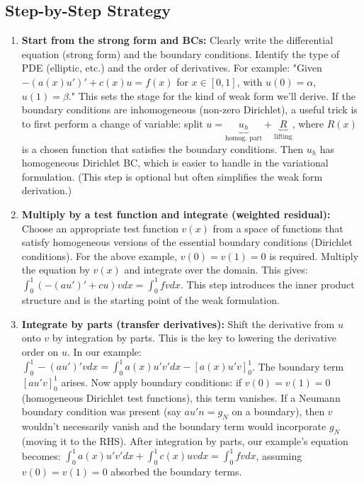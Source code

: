 \documentclass[a4paper,11pt]{report}
\begin{document}
\subsection{Step-by-Step Strategy}

\begin{enumerate}
    \item \textbf{Start from the strong form and BCs:} Clearly write the differential equation (strong form) and the boundary conditions. Identify the type of PDE (elliptic, etc.) and the order of derivatives. For example: "Given $- (a(x) u')' + c(x) u = f(x)$ for $x\in [0,1]$, with $u(0)=\alpha$, $u(1)=\beta$." This sets the stage for the kind of weak form we'll derive. If the boundary conditions are inhomogeneous (non-zero Dirichlet), a useful trick is to first perform a change of variable: split $u = \underbrace{u_h}_{\text{homog. part}} + \underbrace{R}_{\text{lifting}}$, where $R(x)$ is a chosen function that satisfies the boundary conditions. Then $u_h$ has homogeneous Dirichlet BC, which is easier to handle in the variational formulation. (This step is optional but often simplifies the weak form derivation.)

    \item \textbf{Multiply by a test function and integrate (weighted residual):} Choose an appropriate test function $v(x)$ from a space of functions that satisfy homogeneous versions of the essential boundary conditions (Dirichlet conditions). For the above example, $v(0)=v(1)=0$ is required. Multiply the equation by $v(x)$ and integrate over the domain. This gives: $\int_0^1 (-(au')' + cu) v dx = \int_0^1 f v dx$. This step introduces the inner product structure and is the starting point of the weak formulation.

    \item \textbf{Integrate by parts (transfer derivatives):} Shift the derivative from $u$ onto $v$ by integration by parts. This is the key to lowering the derivative order on $u$. In our example: $\int_0^1 -(au')' v dx = \int_0^1 a(x)u' v' dx - [a(x)u' v]_0^1$. The boundary term $[a u' v]_{0}^{1}$ arises. Now apply boundary conditions: if $v(0)=v(1)=0$ (homogeneous Dirichlet test functions), this term vanishes. If a Neumann boundary condition was present (say $a u' n = g_N$ on a boundary), then $v$ wouldn't necessarily vanish and the boundary term would incorporate $g_N$ (moving it to the RHS). After integration by parts, our example's equation becomes: $\int_0^1 a(x)u' v' dx + \int_0^1 c(x)u v dx = \int_0^1 f v dx$, assuming $v(0)=v(1)=0$ absorbed the boundary terms.


\end{enumerate}
\end{document}
